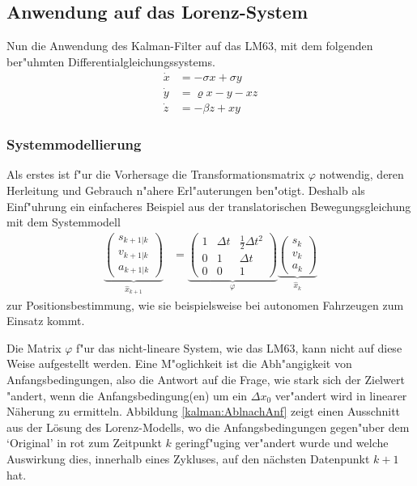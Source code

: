 \begin{refsection}
\subsection{Anwendung auf das Lorenz-System}
Nun die Anwendung des Kalman-Filter auf das LM63, mit dem folgenden ber"uhmten Differentialgleichungssystems.
\begin{equation}
\begin{aligned}
\dot x &= -\sigma x + \sigma y\\
\dot y &= \varrho x - y - x z\\
\dot z &= -\beta z + x y
\end{aligned}
\label{kalman:lm63} 
\end{equation}

\subsubsection{Systemmodellierung}
%
Als erstes ist f"ur die Vorhersage die Transformationsmatrix $\varphi$
notwendig, deren Herleitung und Gebrauch n"ahere Erl"auterungen
ben"otigt. Deshalb als Einf"uhrung ein einfacheres Beispiel aus der
translatorischen Bewegungsgleichung mit dem Systemmodell
\begin{align}
\underbrace{\begin{pmatrix}
s_{k+1|k} \\ 
v_{k+1|k} \\ 
a_{k+1|k}
\end{pmatrix}}_{\hat{x}_{k+1}}
&=
\underbrace{\begin{pmatrix}
 1 & \Delta t & \frac{1}{2}\Delta t^{2} \\ 
 0 & 1 & \Delta t \\ 
 0 & 0 & 1
 \end{pmatrix}}_{\varphi}
\underbrace{\begin{pmatrix}
   s_{k} \\ 
   v_{k} \\ 
   a_{k}
   \end{pmatrix}}_{\hat{x}_{k}}
\label{kalman:Posbest}
\end{align}
zur Positionsbestimmung, wie sie beispielsweise bei autonomen Fahrzeugen
zum Einsatz kommt.

Die Matrix $\varphi$ f"ur das nicht-lineare System, wie das LM63, kann
nicht auf diese  Weise aufgestellt werden. Eine M"oglichkeit ist
die Abh"angigkeit von Anfangsbedingungen, also die Antwort auf 
die Frage, wie stark sich der Zielwert "andert, wenn die Anfangsbedingung(en)
um ein $\Delta x_{0}$ ver"andert wird in linearer Näherung zu ermitteln.
Abbildung \ref{kalman:AblnachAnf} zeigt
einen Ausschnitt aus der Lösung des Lorenz-Modells, wo die Anfangsbedingungen
gegen"uber dem `Original' in rot zum Zeitpunkt $k$ geringf"uging
ver"andert wurde und welche Auswirkung dies, innerhalb eines Zykluses,
auf den nächsten Datenpunkt $k+1$ hat.


\end{refsection}
